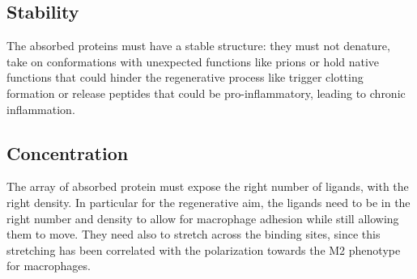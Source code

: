 	\subsection{Stability}
	The absorbed proteins must have a stable structure: they must not denature, take on conformations with unexpected functions like prions or hold native functions that could hinder the regenerative process like trigger clotting formation or release peptides that could be pro-inflammatory, leading to chronic inflammation.

	\subsection{Concentration}
	The array of absorbed protein must expose the right number of ligands, with the right density.
	In particular for the regenerative aim, the ligands need to be in the right number and density to allow for macrophage adhesion while still allowing them to move.
	They need also to stretch across the binding sites, since this stretching has been correlated with the polarization towards the M2 phenotype for macrophages.
